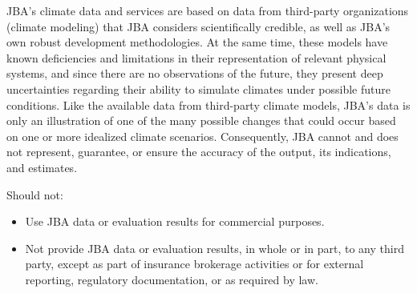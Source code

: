 \documentclass[
]{article}
\begin{document}
\fontsize{11}{13}\selectfont JBA's climate data and services are based
on data from third-party organizations (climate modeling) that JBA
considers scientifically credible, as well as JBA's own robust
development methodologies. At the same time, these models have known
deficiencies and limitations in their representation of relevant
physical systems, and since there are no observations of the future,
they present deep uncertainties regarding their ability to simulate
climates under possible future conditions. Like the available data from
third-party climate models, JBA's data is only an illustration of one of
the many possible changes that could occur based on one or more
idealized climate scenarios. Consequently, JBA cannot and does not
represent, guarantee, or ensure the accuracy of the output, its
indications, and estimates.

\fontsize{11}{13}\selectfont Should not:

\begin{itemize}
  \item {\fontsize{11}{13}\selectfont Use JBA data or evaluation results for commercial      purposes.}
  \item {\fontsize{11}{13}\selectfont Not provide JBA data or evaluation results, in whole   or in part, to any third party, except as part of insurance brokerage activities or for    external reporting, regulatory documentation, or as required by law.}
\end{itemize}
\end{document}
